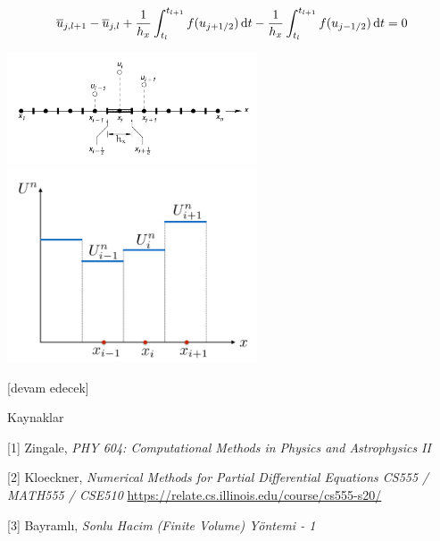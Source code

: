 \documentclass[12pt,fleqn]{article}\usepackage{../../common}
\begin{document}
$$
\overline{u}_{j,l+1} - \overline{u}_{j,l} + 
\frac{1}{h_x} \int_{t_l}^{t_{l+1}} f(u_{j+1/2}) \,\mathrm{d} t  -
\frac{1}{h_x} \int_{t_l}^{t_{l+1}} f(u_{j-1/2}) \,\mathrm{d} t = 0
$$

\includegraphics[width=20em]{12-20-00.png}
\includegraphics[width=20em]{12-19-02.png}




[devam edecek]
  
Kaynaklar

[1] Zingale, {\em PHY 604: Computational Methods in Physics and Astrophysics II}

[2] Kloeckner, {\em Numerical Methods for Partial Differential Equations CS555 / MATH555 / CSE510}
    \url{https://relate.cs.illinois.edu/course/cs555-s20/}

[3] Bayramlı, {\em Sonlu Hacim (Finite Volume) Yöntemi - 1}    
\end{document}
